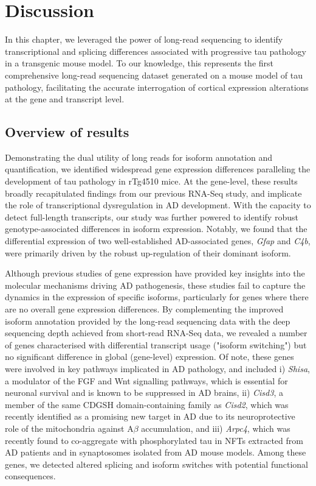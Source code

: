 \clearpage
\section{Discussion}

In this chapter, we leveraged the power of long-read sequencing to identify transcriptional and splicing differences associated with progressive tau pathology in a transgenic mouse model. To our knowledge, this represents the first comprehensive long-read sequencing dataset generated on a mouse model of tau pathology, facilitating the accurate interrogation of cortical expression alterations at the gene and transcript level. 

\subsection{Overview of results}
Demonstrating the dual utility of long reads for isoform annotation and quantification, we identified widespread gene expression differences paralleling the development of tau pathology in rTg4510 mice. At the gene-level, these results broadly recapitulated findings from our previous RNA-Seq study\cite{Castanho2020}, and implicate the role of transcriptional dysregulation in AD development. With the capacity to detect full-length transcripts, our study was further powered to identify robust genotype-associated differences in isoform expression. Notably, we found that the differential expression of two well-established AD-associated genes, \textit{Gfap} and \textit{C4b}, were primarily driven by the robust up-regulation of their dominant isoform. 

Although previous studies of gene expression have provided key insights into the molecular mechanisms driving AD pathogenesis\cite{Castanho2020,Salih2019,Annese2018,Magistri2015}, these studies fail to capture the dynamics in the expression of specific isoforms, particularly for genes where there are no overall gene expression differences. By complementing the improved isoform annotation provided by the long-read sequencing data with the deep sequencing depth achieved from short-read RNA-Seq data, we revealed a number of genes characterised with differential transcript usage ("isoform switching") but no significant difference in global (gene-level) expression. Of note, these genes were involved in key pathways implicated in AD pathology, and included i) \textit{Shisa}, a modulator of the FGF and Wnt signalling pathways, which is essential for neuronal survival and is known to be suppressed in AD brains\cite{Jia2019}, ii) \textit{Cisd3}, a member of the same CDGSH domain-containing family as \textit{Cisd2}, which was recently identified as a promising new target in AD due to its neuroprotective role of the mitochondria against A$\beta$ accumulation\cite{Chen2020}, and iii) \textit{Arpc4}, which was recently found to co-aggregate with phosphorylated tau in NFTs extracted from AD patients\cite{Drummond2020} and in synaptosomes isolated from AD mouse models\cite{Li2020a}. Among these genes, we detected altered splicing and isoform switches with potential functional consequences.  
  

